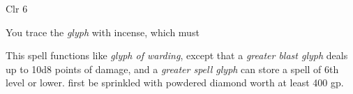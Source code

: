 
\begin{description*}
\item[Level:] Clr 6
\item[Arcane Material Component:] You trace the \textit{glyph} with incense, which must
\end{description*}

This spell functions like \textit{glyph of warding}, except that a \textit{greater
blast glyph} deals up to 10d8 points of damage, and a \textit{greater spell glyph
}can store a spell of 6th level or lower.
first be sprinkled with powdered diamond worth at least 400 gp.